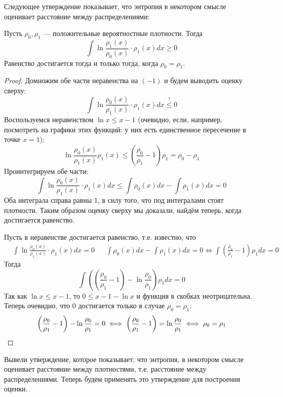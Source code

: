 Следующее утверждение показывает, что энтропия в некотором смысле оценивает расстояние между распределениями:
\begin{lemma*}
    Пусть $\rho_0, \rho_1$ --- положительные вероятностные плотности. Тогда
    \[
        \int \ln\frac{\rho_1(x)}{\rho_0(x)} \cdot \rho_1(x)dx \geq 0
    \]
    Равенство достигается тогда и только тогда, когда $\rho_0 = \rho_1$.
\end{lemma*}
\begin{proof}
    Домножим обе части неравенства на $(-1)$ и будем выводить оценку сверху:
    \[
        \int \ln\frac{\rho_0(x)}{\rho_1(x)} \cdot \rho_1(x)dx \overset{?}{\leq} 0
    \]
    Воспользуемся неравенством $\ln x \leq x - 1$ (очевидно, если, например, посмотреть на графики этих функций: у них есть единственное пересечение в
    точке $x = 1$):
    \[
        \ln\frac{\rho_0(x)}{\rho_1(x)}\rho_1(x) \leq \left( \frac{\rho_0}{\rho_1} - 1 \right)\rho_1 = \rho_0 - \rho_1
    \]
    Проинтегрируем обе части:
    \[
        \int \ln\frac{\rho_0(x)}{\rho_1(x)} \cdot \rho_1(x)dx \leq \int \rho_{0}(x)dx - \int \rho_{1}(x)dx = 0
    \]
    Оба интеграла справа равны 1, в силу того, что под интегралами стоят плотности. Таким образом оценку сверху мы доказали, найдём теперь, когда достигается равенство.

    Пусть в неравенстве достигается равенство, т.е. известно, что
    \begin{align*}
        &\int \ln\frac{\rho_0(x)}{\rho_1(x)} \cdot \rho_1(x)dx = 0
        &&\int \rho_{0}(x)dx - \int \rho_{1}(x)dx = 0 \iff \int \left(\frac{\rho_0}{\rho_1} - 1\right) \rho_1 dx = 0
    \end{align*}
    Тогда
    \[
        \int \left(\left(\frac{\rho_0}{\rho_1} - 1\right) - \ln\frac{\rho_0}{\rho_1}\right)\rho_{1}dx = 0
    \]
    Так как $\ln x \leq x - 1$, то $0 \leq x - 1 - \ln x$ и функция в скобках неотрицательна. Теперь очевидно, что 0 достигается только в случае
    $\rho_0 = \rho_1$:
    \[
        \left(\frac{\rho_0}{\rho_1} - 1\right) - \ln\frac{\rho_0}{\rho_1} = 0
        \iff
        \left(\frac{\rho_0}{\rho_1} - 1\right) = \ln\frac{\rho_0}{\rho_1}
        \iff
        \rho_0 = \rho_1
        \qedhere
    \]
\end{proof}

Вывели утверждение, которое показывает, что энтропия, в некотором смысле оценивает расстояние между плотностями, т.е. расстояние между распределениями.
Теперь будем применять это утверждение для построения оценки.

